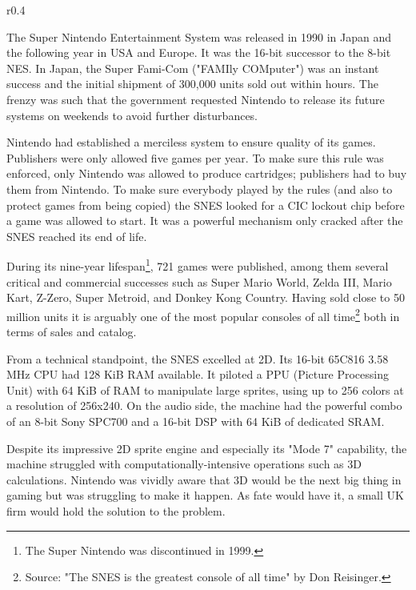 \begin{wrapfigure}[3]{r}{0.4\textwidth}{
\centering {}}
\end{wrapfigure}
The Super Nintendo Entertainment System was released in 1990 in Japan and the following year in USA and Europe. It was the 16-bit successor to the 8-bit NES. In Japan, the Super Fami-Com ("FAMIly COMputer") was an instant success and the initial shipment of 300,000 units sold out within hours. The frenzy was such that the government requested Nintendo to release its future systems on weekends to avoid further disturbances.\\
\par
Nintendo had established a merciless system to ensure quality of its games. Publishers were only allowed five games per year. To make sure this rule was enforced, only Nintendo was allowed to produce cartridges; publishers had to buy them from Nintendo. To make sure everybody played by the rules (and also to protect games from being copied) the SNES looked for a CIC lockout chip before a game was allowed to start. It was a powerful mechanism only cracked after the SNES reached its end of life.\\
\par
During its nine-year lifespan\footnote{The Super Nintendo was discontinued in 1999.}, 721 games were published, among them several critical and commercial successes such as Super Mario World, Zelda III, Mario Kart, Z-Zero, Super Metroid, and Donkey Kong Country. Having sold close to 50 million units it is arguably one of the most popular consoles of all time\footnote{Source: "The SNES is the greatest console of all time" by Don Reisinger.} both in terms of sales and catalog.\\
\par
{}
\par
From a technical standpoint, the SNES excelled at 2D. Its 16-bit 65C816 3.58 MHz CPU had 128 KiB RAM available. It piloted a PPU (Picture Processing Unit) with 64 KiB of RAM to manipulate large sprites, using up to 256 colors at a resolution of 256x240. On the audio side, the machine had the powerful combo of an 8-bit Sony SPC700 and a 16-bit DSP with 64 KiB of dedicated SRAM.\\
\par

Despite its impressive 2D sprite engine and especially its "Mode 7" capability, the machine struggled with computationally-intensive operations such as 3D calculations. Nintendo was vividly aware that 3D would be the next big thing in gaming but was struggling to make it happen. As fate would have it, a small UK firm would hold the solution to the problem.\\

